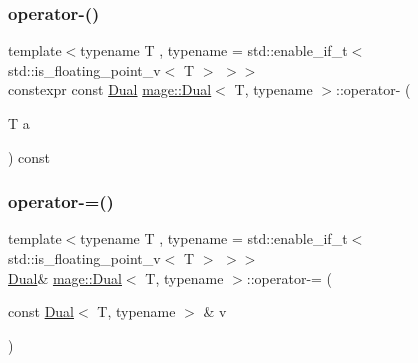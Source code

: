 \subsubsection{\texorpdfstring{operator-\/()}{operator-()}\hspace{0.1cm}{\footnotesize\ttfamily [3/3]}}
{\footnotesize\ttfamily template$<$typename T , typename  = std\+::enable\+\_\+if\+\_\+t$<$ std\+::is\+\_\+floating\+\_\+point\+\_\+v$<$ T $>$ $>$$>$ \\
constexpr const \mbox{\hyperlink{structmage_1_1_dual}{Dual}} \mbox{\hyperlink{structmage_1_1_dual}{mage\+::\+Dual}}$<$ T, typename $>$\+::operator-\/ (\begin{DoxyParamCaption}\item[{T}]{a }\end{DoxyParamCaption}) const\hspace{0.3cm}{\ttfamily [noexcept]}}

\mbox{\label{structmage_1_1_dual_afc7163000d7f36b6e5199233951e5975}} 
\subsubsection{\texorpdfstring{operator-\/=()}{operator-=()}\hspace{0.1cm}{\footnotesize\ttfamily [1/2]}}
{\footnotesize\ttfamily template$<$typename T , typename  = std\+::enable\+\_\+if\+\_\+t$<$ std\+::is\+\_\+floating\+\_\+point\+\_\+v$<$ T $>$ $>$$>$ \\
\mbox{\hyperlink{structmage_1_1_dual}{Dual}}\& \mbox{\hyperlink{structmage_1_1_dual}{mage\+::\+Dual}}$<$ T, typename $>$\+::operator-\/= (\begin{DoxyParamCaption}\item[{const \mbox{\hyperlink{structmage_1_1_dual}{Dual}}$<$ T, typename $>$ \&}]{v }\end{DoxyParamCaption})\hspace{0.3cm}{\ttfamily [noexcept]}}

\mbox{\label{structmage_1_1_dual_a44a281c87be500d605e3b717ebc45b85}} 
